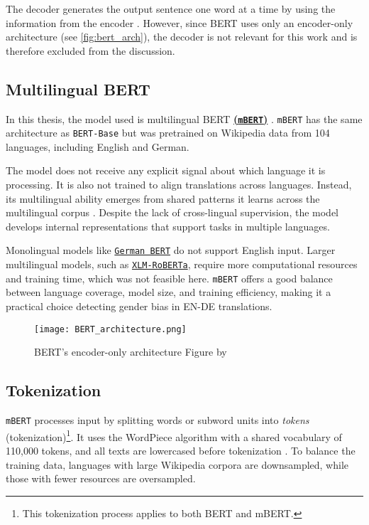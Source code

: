 The decoder generates the output sentence one word at a time by using the information from the encoder \parencite{xiaoIntroductionTransformersNLP2023}. However, since BERT uses only an encoder-only architecture (see \autoref{fig:bert_arch}), the decoder is not relevant for this work and is therefore excluded from the discussion.

\subsection{Multilingual BERT}
    In this thesis, the model used is multilingual BERT \textbf{\href{https://huggingface.co/google-bert/bert-base-multilingual-cased}{(\texttt{mBERT})}} \parencite{devlinBERTPretrainingDeep2019}. \texttt{mBERT} has the same architecture as \texttt{BERT-Base} but was pretrained on Wikipedia data from 104 languages, including English and German.
    
    The model does not receive any explicit signal about which language it is processing. It is also not trained to align translations across languages. Instead, its multilingual ability emerges from shared patterns it learns across the multilingual corpus \parencite{piresHowMultilingualMultilingual2019}. Despite the lack of cross-lingual supervision, the model develops internal representations that support tasks in multiple languages.

    Monolingual models like \href{https://huggingface.co/google-bert/bert-base-german-cased}{\texttt{German BERT}} do not support English input. Larger multilingual models, such as \href{https://huggingface.co/docs/transformers/en/model_doc/xlm-roberta}{\texttt{XLM-RoBERTa}}, require more computational resources and training time, which was not feasible here. \texttt{mBERT} offers a good balance between language coverage, model size, and training efficiency, making it a practical choice detecting gender bias in EN-DE translations.

\begin{figure}
    \centering
	\texttt{[image: BERT\_architecture.png]}	
    \caption[BERT's encoder-only architecture]{BERT's encoder-only architecture Figure by \textcite{smithCompleteGuideBERT2024}}
    \label{fig:bert_arch}
\end{figure}

\subsection{Tokenization}
\texttt{mBERT} processes input by splitting words or subword units into \textit{tokens} (tokenization)\footnote{This tokenization process applies to both BERT and mBERT.}. It uses the WordPiece algorithm with a shared vocabulary of 110,000 tokens, and all texts are lowercased before tokenization \parencite{devlinMultilingualBERTGitHub2018}. To balance the training data, languages with large Wikipedia corpora are downsampled, while those with fewer resources are oversampled.

